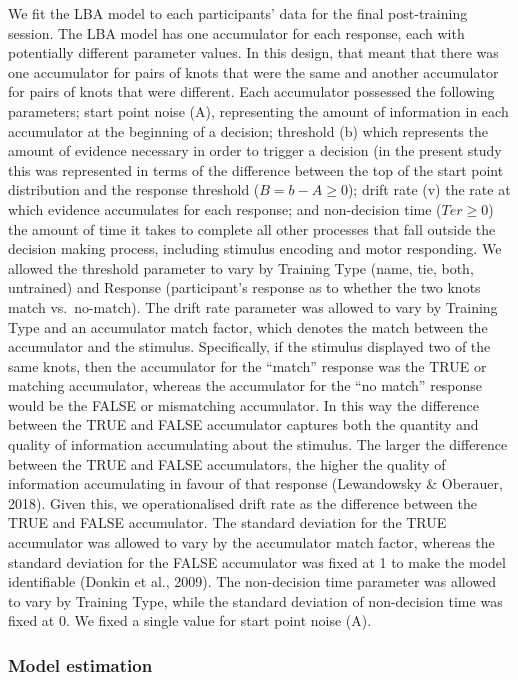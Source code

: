 \documentclass[
  man, donotrepeattitle,floatsintext]{apa6}
\begin{document}
We fit the LBA model to each participants' data for the final post-training session. The LBA model has one accumulator for each response, each with potentially different parameter values. In this design, that meant that there was one accumulator for pairs of knots that were the same and another accumulator for pairs of knots that were different. Each accumulator possessed the following parameters; start point noise (A), representing the amount of information in each accumulator at the beginning of a decision; threshold (b) which represents the amount of evidence necessary in order to trigger a decision (in the present study this was represented in terms of the difference between the top of the start point distribution and the response threshold (\(B = b - A \ge 0\)); drift rate (v) the rate at which evidence accumulates for each response; and non-decision time (\(Ter \ge 0\)) the amount of time it takes to complete all other processes that fall outside the decision making process, including stimulus encoding and motor responding. We allowed the threshold parameter to vary by Training Type (name, tie, both, untrained) and Response (participant's response as to whether the two knots match vs.~no-match). The drift rate parameter was allowed to vary by Training Type and an accumulator match factor, which denotes the match between the accumulator and the stimulus. Specifically, if the stimulus displayed two of the same knots, then the accumulator for the ``match'' response was the TRUE or matching accumulator, whereas the accumulator for the ``no match'' response would be the FALSE or mismatching accumulator. In this way the difference between the TRUE and FALSE accumulator captures both the quantity and quality of information accumulating about the stimulus. The larger the difference between the TRUE and FALSE accumulators, the higher the quality of information accumulating in favour of that response (Lewandowsky \& Oberauer, 2018). Given this, we operationalised drift rate as the difference between the TRUE and FALSE accumulator. The standard deviation for the TRUE accumulator was allowed to vary by the accumulator match factor, whereas the standard deviation for the FALSE accumulator was fixed at 1 to make the model identifiable (Donkin et al., 2009). The non-decision time parameter was allowed to vary by Training Type, while the standard deviation of non-decision time was fixed at 0. We fixed a single value for start point noise (A).

\subsubsection{Model estimation}\label{model-estimation}
\end{document}
